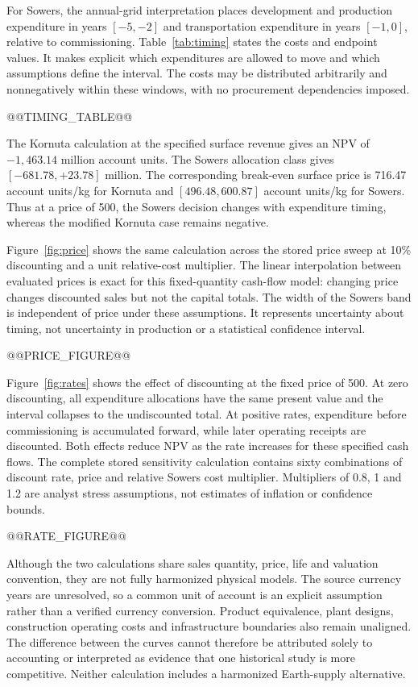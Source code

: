 \documentclass[final,5p,times,twocolumn]{elsarticle}
\begin{document}
For Sowers, the annual-grid interpretation places development and production expenditure in years $[-5,-2]$ and transportation expenditure in years $[-1,0]$, relative to commissioning. Table~\ref{tab:timing} states the costs and endpoint values. It makes explicit which expenditures are allowed to move and which assumptions define the interval. The costs may be distributed arbitrarily and nonnegatively within these windows, with no procurement dependencies imposed.

@@TIMING_TABLE@@

The Kornuta calculation at the specified surface revenue gives an NPV of $-1,463.14$ million account units. The Sowers allocation class gives $[-681.78,+23.78]$ million. The corresponding break-even surface price is 716.47 account units/kg for Kornuta and $[496.48,600.87]$ account units/kg for Sowers. Thus at a price of 500, the Sowers decision changes with expenditure timing, whereas the modified Kornuta case remains negative.

Figure~\ref{fig:price} shows the same calculation across the stored price sweep at 10\% discounting and a unit relative-cost multiplier. The linear interpolation between evaluated prices is exact for this fixed-quantity cash-flow model: changing price changes discounted sales but not the capital totals. The width of the Sowers band is independent of price under these assumptions. It represents uncertainty about timing, not uncertainty in production or a statistical confidence interval.

@@PRICE_FIGURE@@

Figure~\ref{fig:rates} shows the effect of discounting at the fixed price of 500. At zero discounting, all expenditure allocations have the same present value and the interval collapses to the undiscounted total. At positive rates, expenditure before commissioning is accumulated forward, while later operating receipts are discounted. Both effects reduce NPV as the rate increases for these specified cash flows. The complete stored sensitivity calculation contains sixty combinations of discount rate, price and relative Sowers cost multiplier. Multipliers of 0.8, 1 and 1.2 are analyst stress assumptions, not estimates of inflation or confidence bounds.

@@RATE_FIGURE@@

Although the two calculations share sales quantity, price, life and valuation convention, they are not fully harmonized physical models. The source currency years are unresolved, so a common unit of account is an explicit assumption rather than a verified currency conversion. Product equivalence, plant designs, construction operating costs and infrastructure boundaries also remain unaligned. The difference between the curves cannot therefore be attributed solely to accounting or interpreted as evidence that one historical study is more competitive. Neither calculation includes a harmonized Earth-supply alternative.
\end{document}
